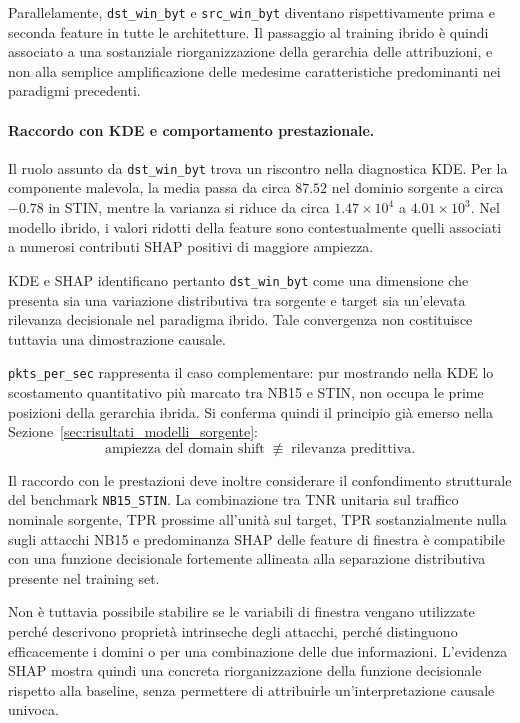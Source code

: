 Parallelamente, \texttt{dst\_win\_byt} e \texttt{src\_win\_byt} diventano rispettivamente prima e seconda feature in tutte le architetture. 
Il passaggio al training ibrido è quindi associato a una sostanziale riorganizzazione della gerarchia delle attribuzioni, e non alla semplice amplificazione delle medesime caratteristiche predominanti nei paradigmi precedenti.

\paragraph{Raccordo con KDE e comportamento prestazionale.}
Il ruolo assunto da \texttt{dst\_win\_byt} trova un riscontro nella diagnostica KDE. 
Per la componente malevola, la media passa da circa $87.52$ nel dominio sorgente a circa $-0.78$ in STIN, mentre la varianza si riduce da circa $1.47\times10^{4}$ a $4.01\times10^{3}$. 
Nel modello ibrido, i valori ridotti della feature sono contestualmente quelli associati a numerosi contributi SHAP positivi di maggiore ampiezza.

KDE e SHAP identificano pertanto \texttt{dst\_win\_byt} come una dimensione che presenta sia una variazione distributiva tra sorgente e target sia un'elevata rilevanza decisionale nel paradigma ibrido. 
Tale convergenza non costituisce tuttavia una dimostrazione causale.

\texttt{pkts\_per\_sec} rappresenta il caso complementare: pur mostrando nella KDE lo scostamento quantitativo più marcato tra NB15 e STIN, non occupa le prime posizioni della gerarchia ibrida. 
Si conferma quindi il principio già emerso nella Sezione~\ref{sec:risultati_modelli_sorgente}:
\[
    \text{ampiezza del domain shift}
    \;\not\equiv\;
    \text{rilevanza predittiva}.
\]

Il raccordo con le prestazioni deve inoltre considerare il confondimento strutturale del benchmark \texttt{NB15\_STIN}. 
La combinazione tra TNR unitaria sul traffico nominale sorgente, TPR prossime all'unità sul target, TPR sostanzialmente nulla sugli attacchi NB15 e predominanza SHAP delle feature di finestra è compatibile con una funzione decisionale fortemente allineata alla separazione distributiva presente nel training set.

Non è tuttavia possibile stabilire se le variabili di finestra vengano utilizzate perché descrivono proprietà intrinseche degli attacchi, perché distinguono efficacemente i domini o per una combinazione delle due informazioni. 
L'evidenza SHAP mostra quindi una concreta riorganizzazione della funzione decisionale rispetto alla baseline, senza permettere di attribuirle un'interpretazione causale univoca.


